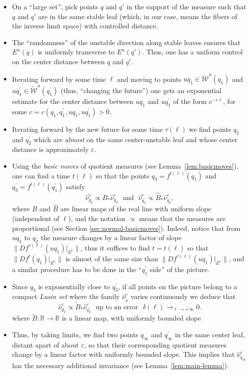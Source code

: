 \documentclass[a4paper,11pt,reqno]{amsart}
\newcommand{\R}{{\mathbb R}}
\newcommand{\cW}{{\mathcal W}}
\newcommand{\eps}{\varepsilon}
\newcommand{\tix}{\tilde{x}}
\newcommand{\w}{\widetilde{\cW}}
\theoremstyle{definition}
\begin{document}
\begin{itemize}
   \item On a ``large set'', pick points $q$ and $q'$ in the support of the measure such that $q$ and $q'$ are in the same stable leaf (which, in our case, means the fibers of the inverse limit space) with controlled distance.
    \item The ``randomness'' of the unstable direction along stable leaves ensures that $E^u(q)$ is uniformly transverse to $E^u(q')$. Thus, one has a uniform control on the center distance between $q$ and $q'$.
    \item Iterating forward by some time $\ell$ and moving to points $uq_1\in\w^u(q_1)$ and $uq_1^{\prime}\in\w^u(q^{\prime}_1)$ (thus, ``changing the future'') one gets an exponential estimate for the center distance between $uq_1$ and $uq_1^{\prime}$ of the form $e^{-c\ell}$, for some $c=c(q_1,q_1^{\prime},uq_1,uq_1^{\prime})>0$. 
    \item Iterating forward by the new future for some time $\tau(\ell)$ we find points $q_2$ and $q_2^{\prime}$ which are \emph{almost} on the same center-unstable leaf and whose center distance is approximately $\eps$.
    \item Using the \emph{basic moves} of quotient measures (see Lemma~\ref{lem:basicmoves}), one can find a time $t(\ell)$ so that the points $q_3=f^{t(\ell)}(q_1)$ and $q_3^{\prime}=f^{t(\ell)}(q_1^{\prime})$ satisfy 
    \[
    \hat{\nu}^c_{q_2}\propto B_*\hat{\nu}^c_{q_3}\:\:\:\textrm{and}\:\:\:\hat{\nu}^c_{q_2^{\prime}}\propto \hat{B}_*\hat{\nu}^c_{q_3^{\prime}},
    \]
    where $B$ and $\hat{B}$ are linear maps of the real line with uniform slope (independent of $\ell$), and the notation $\propto$ means that the measures are proportional (see Section \ref{sec:normal-basicmoves}). Indeed, notice that from $uq_1$ to $q_2$ the measure changes by a linear factor of slope $\|Df^{\tau(\ell)}(uq_1)|_{E^c}\|$, thus it suffices to find $t=t(\ell)$ so that $\|Df^t(q_1)|_{E^c}\|$ is almost of the same size than $\|Df^{\tau(\ell)}(uq_1)|_{E^c}\|$, and a similar procedure has to be done in the ``$q_1^{\prime}$ side'' of the picture.  
    \item Since $q_3$ is exponentially close to $q_3^{\prime}$, if all points on the picture belong to a compact \emph{Lusin set} where the family $\hat{\nu}^c_{\tix}$ varies continuously we deduce that 
    \[
    \hat{\nu}^c_{q_2}\propto\widetilde{B}_*\hat{\nu}^c_{q_2^{\prime}}\:\:\:\textrm{up to an error}\:\:\:\delta(\ell)\to_{\ell\to+\infty} 0.
    \]
    where $\widetilde{B}:\R\to\R$ is a linear map, with uniformly bounded slope
    \item Thus, by taking limits, we find two points $q_{\infty}$ and $q_{\infty}^{\prime}$ in the same center leaf, distant apart of about $\eps$, so that their corresponding quotient measures change by a linear factor with uniformly bounded slope. This implies that $\hat{\nu}^c_{q_{\infty}}$ has the necessary additional invariance (see Lemma~\ref{lem:main-lemma}). 
\end{itemize}
\end{document}
